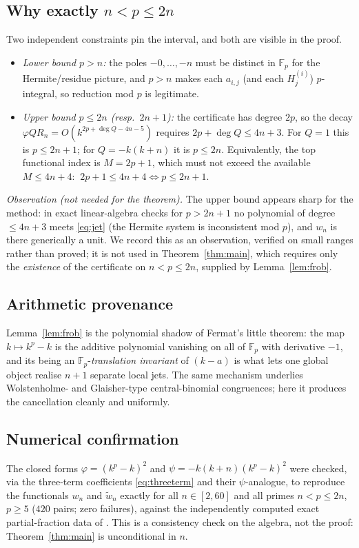 \documentclass[11pt]{article}
\theoremstyle{definition}
\newcommand{\Fp}{\mathbb{F}_p}
\newcommand{\wt}{\widetilde}
\begin{document}
\subsection*{Why exactly $n<p\le 2n$}
Two independent constraints pin the interval, and both are visible in the proof.
\begin{itemize}[leftmargin=1.6em]
\item \emph{Lower bound $p>n$:} the poles $-0,\dots,-n$ must be distinct in $\Fp$
for the Hermite/residue picture, and $p>n$ makes each $a_{i,j}$ (and each
$H_j^{(i)}$) $p$-integral, so reduction mod $p$ is legitimate.
\item \emph{Upper bound $p\le 2n$ (resp.\ $2n+1$):} the certificate has degree
$2p$, so the decay $\varphi Q R_n=O(k^{2p+\deg Q-4n-5})$ requires
$2p+\deg Q\le 4n+3$. For $Q=1$ this is $p\le 2n+1$; for $Q=-k(k+n)$ it is
$p\le2n$. Equivalently, the top functional index is $M=2p+1$, which must not
exceed the available $M\le 4n+4$: $\ 2p+1\le4n+4\iff p\le2n+1$.
\end{itemize}
\emph{Observation (not needed for the theorem).} The upper bound appears sharp
for the method: in exact linear-algebra checks for $p>2n+1$ no polynomial of
degree $\le 4n+3$ meets \eqref{eq:jet} (the Hermite system is inconsistent
mod $p$), and $w_n$ is there generically a unit. We record this as an
observation, verified on small ranges rather than proved; it is not used in
Theorem~\ref{thm:main}, which requires only the \emph{existence} of the
certificate on $n<p\le 2n$, supplied by Lemma~\ref{lem:frob}.

\subsection*{Arithmetic provenance}
Lemma~\ref{lem:frob} is the polynomial shadow of Fermat's little theorem: the
map $k\mapsto k^p-k$ is the additive polynomial vanishing on all of $\Fp$ with
derivative $-1$, and its being an $\Fp$-\emph{translation invariant} of
$(k-a)$ is what lets one global object realise $n+1$ separate local jets. The
same mechanism underlies Wolstenholme- and Glaisher-type central-binomial
congruences; here it produces the cancellation cleanly and uniformly.

\subsection*{Numerical confirmation}
The closed forms $\varphi=(k^p-k)^2$ and $\psi=-k(k+n)(k^p-k)^2$ were checked, via
the three-term coefficients \eqref{eq:threeterm} and their $\psi$-analogue,
to reproduce the functionals $w_n$ and $\wt w_n$ exactly for all $n\in[2,60]$
and all primes $n<p\le2n$, $p\ge5$ ($420$ pairs; zero failures), against the
independently computed exact partial-fraction data of \cite{LemmaCB}. This is a
consistency check on the algebra, not the proof: Theorem~\ref{thm:main} is
unconditional in $n$.
\end{document}
